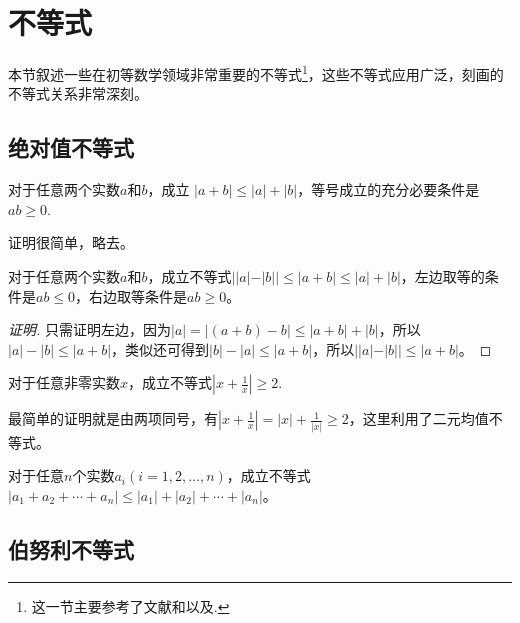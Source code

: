 
\section{不等式}
\label{sec:some-important-inequation}

本节叙述一些在初等数学领域非常重要的不等式\footnote{这一节主要参考了文献\cite{contest-math-course}和\cite{caculus-course}以及\cite{olympic-math}.}，这些不等式应用广泛，刻画的不等式关系非常深刻。

\subsection{绝对值不等式}
\label{sec:absolute-value-inequality}

\begin{theorem}
  对于任意两个实数$a$和$b$，成立 $|a+b| \leqslant |a| + |b|$，等号成立的充分必要条件是$ab \geqslant 0$.
\end{theorem}

证明很简单，略去。

\begin{inference}
  对于任意两个实数$a$和$b$，成立不等式$||a|-|b|| \leqslant |a+b| \leqslant |a| + |b|$，左边取等的条件是$ab \leqslant 0$，右边取等条件是$ab \geqslant 0$。
\end{inference}

\begin{proof}[证明]
  只需证明左边，因为$|a|=|(a+b)-b| \leqslant |a+b| + |b|$，所以$|a|-|b| \leqslant |a+b|$，类似还可得到$|b|-|a| \leqslant |a+b|$，所以$||a|-|b|| \leqslant |a+b|$。
\end{proof}

\begin{example}
  对于任意非零实数$x$，成立不等式$\left| x+\frac{1}{x} \right| \geqslant 2$.

  最简单的证明就是由两项同号，有$\left| x+\frac{1}{x} \right| = |x|+\frac{1}{|x|} \geqslant 2$，这里利用了二元均值不等式。
\end{example}

\begin{inference}
  对于任意$n$个实数$a_i(i=1,2,\ldots,n)$，成立不等式$|a_1+a_2+\cdots+a_n| \leqslant |a_1| + |a_2| + \cdots + |a_n|$。
\end{inference}

\subsection{伯努利不等式}
\label{sec:bernoulli-inequality}

